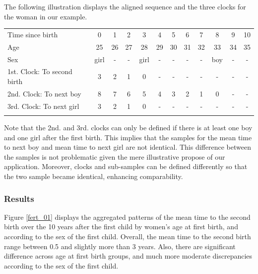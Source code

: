 \documentclass{article}
\begin{document}
The following illustration displays the aligned sequence and the three clocks for the woman in our example.\\

\begin{center}
\begin{tabular}{lccccccccccc}
\hline
    Time since birth & 0 & 1 & 2 & 3 & 4 & 5 & 6 & 7 & 8 & 9 & 10 \\
    Age & 25 & 26 & 27 & 28 & 29 & 30 & 31 & 32 & 33 & 34 & 35 \\
    Sex & girl & - & - & girl & - & - & - & - & boy & - & - \\
    1st. Clock: To second birth & 3 & 2 & 1 & 0 & - & - & - & - & - & - & - \\
    2nd. Clock: To next boy & 8 & 7 & 6 & 5 & 4 & 3 & 2 & 1 & 0 & - & - \\
    3rd. Clock: To next girl & 3 & 2 & 1 & 0 & - & - & - & - & - & - & - \\\hline\\
\end{tabular}
\end{center}

Note that the 2nd. and 3rd. clocks can only be defined if there is at least one boy and one girl after the first birth. This implies that the samples for the mean time to next boy and mean time to next girl are not identical. This difference between the samples is not problematic given the mere illustrative propose of our application. Moreover, clocks and sub-samples can be defined differently so that the two sample became identical, enhancing comparability.

\subsubsection{Results}
Figure \ref{fert_01} displays the aggregated patterns of the mean time to the second birth over the 10 years after the first child by women's age at first birth, and according to the sex of the first child. Overall, the mean time to the second birth range between 0.5 and slightly more than 3 years. Also, there are significant difference across age at first birth groups, and much more moderate discrepancies according to the sex of the first child.
\end{document}
